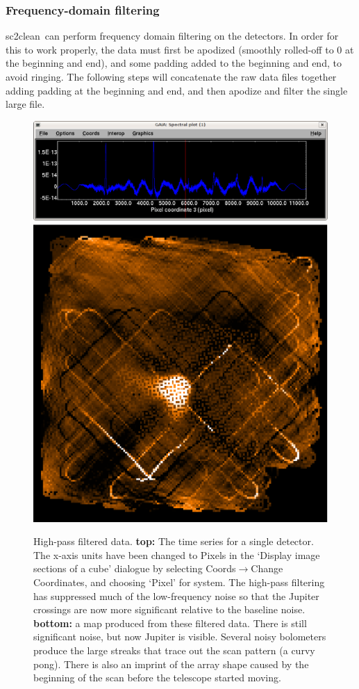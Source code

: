\documentclass[twoside,11pt]{article}
\newcommand{\task}[1]{\textsf{#1}}
\newcommand{\clean}{\xref{\task{sc2clean}}{sun258}{SC2CLEAN}}
\newcommand{\xref}[3]{#1}
\newcommand{\xlabel}[1]{}
\renewcommand{\_}{\texttt{\symbol{95}}}
\begin{document}
\subsubsection{\xlabel{fftfilter}Frequency-domain filtering} 

\clean\ can perform frequency domain filtering on the detectors. In
order for this to work properly, the data must first be apodized
(smoothly rolled-off to 0 at the beginning and end), and some padding
added to the beginning and end, to avoid ringing. The following steps
will concatenate the raw data files together adding padding at the
beginning and end, and then apodize and filter the single large file.

\begin{figure}
\begin{center}
\includegraphics[width=\linewidth]{spec_filt.eps} \\
\vspace{0.3in}
\includegraphics[width=0.5\linewidth]{map_highpass.eps}
\caption{High-pass filtered data. {\bf top:} The time series for a
  single detector. The x-axis units have been changed to Pixels in the
  `Display image sections of a cube' dialogue by selecting
  Coords$\rightarrow$Change Coordinates, and choosing `Pixel' for
  system. The high-pass filtering has suppressed much of the
  low-frequency noise so that the Jupiter crossings are now more
  significant relative to the baseline noise. {\bf bottom:} a map
  produced from these filtered data. There is still significant noise,
  but now Jupiter is visible. Several noisy bolometers produce the
  large streaks that trace out the scan pattern (a curvy pong). There
  is also an imprint of the array shape caused by the beginning of the
  scan before the telescope started moving.}
\label{fig:highpass}
\end{center}
\end{figure}
\end{document}
